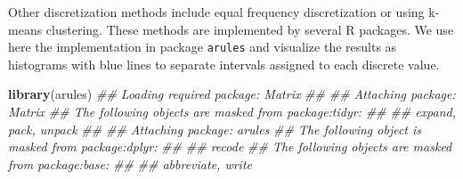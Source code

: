\documentclass[
  notitlepage]{book}
\newenvironment{Shaded}{\begin{snugshade}}{\end{snugshade}}
\newcommand{\CommentTok}[1]{\textcolor[rgb]{0.56,0.35,0.01}{\textit{#1}}}
\newcommand{\KeywordTok}[1]{\textcolor[rgb]{0.13,0.29,0.53}{\textbf{#1}}}
\newcommand{\NormalTok}[1]{#1}
\begin{document}
Other discretization methods include equal frequency discretization or
using k-means clustering. These methods are implemented by several R
packages. We use here the implementation in package \texttt{arules} and
visualize the results as histograms with blue lines to separate
intervals assigned to each discrete value.

\begin{Shaded}
\begin{Highlighting}[]
\KeywordTok{library}\NormalTok{(arules)}
\CommentTok{\#\# Loading required package: Matrix}
\CommentTok{\#\# }
\CommentTok{\#\# Attaching package: \textquotesingle{}Matrix\textquotesingle{}}
\CommentTok{\#\# The following objects are masked from \textquotesingle{}package:tidyr\textquotesingle{}:}
\CommentTok{\#\# }
\CommentTok{\#\#     expand, pack, unpack}
\CommentTok{\#\# }
\CommentTok{\#\# Attaching package: \textquotesingle{}arules\textquotesingle{}}
\CommentTok{\#\# The following object is masked from \textquotesingle{}package:dplyr\textquotesingle{}:}
\CommentTok{\#\# }
\CommentTok{\#\#     recode}
\CommentTok{\#\# The following objects are masked from \textquotesingle{}package:base\textquotesingle{}:}
\CommentTok{\#\# }
\CommentTok{\#\#     abbreviate, write}
\end{Highlighting}
\end{Shaded}
\end{document}
